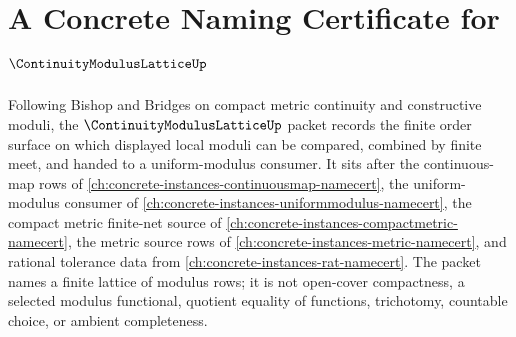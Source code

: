 \chapter{A Concrete Naming Certificate for $\ContinuityModulusLatticeUp$}
\label{ch:concrete-instances-continuity-modulus-lattice-namecert}

Following Bishop and Bridges on compact metric continuity and constructive moduli, the $\ContinuityModulusLatticeUp$ packet records the finite order surface on which displayed local moduli can be compared, combined by finite meet, and handed to a uniform-modulus consumer. It sits after the continuous-map rows of \autoref{ch:concrete-instances-continuousmap-namecert}, the uniform-modulus consumer of \autoref{ch:concrete-instances-uniformmodulus-namecert}, the compact metric finite-net source of \autoref{ch:concrete-instances-compactmetric-namecert}, the metric source rows of \autoref{ch:concrete-instances-metric-namecert}, and rational tolerance data from \autoref{ch:concrete-instances-rat-namecert}. The packet names a finite lattice of modulus rows; it is not open-cover compactness, a selected modulus functional, quotient equality of functions, trichotomy, countable choice, or ambient completeness.

